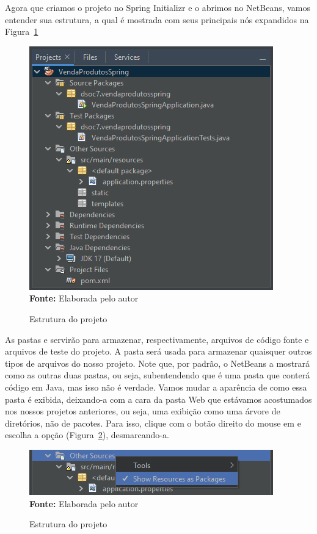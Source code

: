 Agora que criamos o projeto no Spring Initializr e o abrimos no NetBeans, vamos entender sua estrutura, a qual é mostrada com seus principais nós expandidos na Figura~\ref{fig:cap10EstruturaProjeto}

\FloatBarrier
\begin{figure}[!htbp]
    \centering
    \caption{Estrutura do projeto}
    \includegraphics[scale=1]{imagens/cap10EstruturaProjeto}
    \\\textbf{Fonte:} Elaborada pelo autor
    \label{fig:cap10EstruturaProjeto}
\end{figure}
\FloatBarrier

As pastas  e  servirão para armazenar, respectivamente, arquivos de código fonte e arquivos de teste do projeto. A pasta  será usada para armazenar quaisquer outros tipos de arquivos do nosso projeto. Note que, por padrão, o NetBeans a mostrará como as outras duas pastas, ou seja, subentendendo que é uma pasta que conterá código em Java, mas isso não é verdade. Vamos mudar a aparência de como essa pasta é exibida, deixando-a com a cara da pasta Web que estávamos acostumados nos nossos projetos anteriores, ou seja, uma exibição como uma árvore de diretórios, não de pacotes. Para isso, clique com o botão direito do mouse em  e escolha a opção  (Figura~\ref{fig:cap10ShowResourcesAsPackages}), desmarcando-a. 

\FloatBarrier
\begin{figure}[!htbp]
    \centering
    \caption{Estrutura do projeto}
    \includegraphics[scale=1]{imagens/cap10ShowResourcesAsPackages}
    \\\textbf{Fonte:} Elaborada pelo autor
    \label{fig:cap10ShowResourcesAsPackages}
\end{figure}
\FloatBarrier

